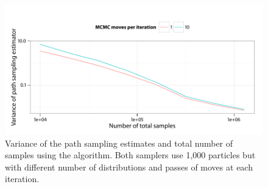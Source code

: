 \begin{figure}[t]
  \UseAltLinespread
  \includegraphics[width=\linewidth]{fig_src/MCMC_Iter_Var}
  \caption[Variance of path sampling estimator and total number of samples
  using \protect\smc algorithm]
  {Variance of the path sampling estimates and total number of samples
    using the \smc[2] algorithm. Both samplers use 1,000 particles but with
    different number of distributions and passes of \mcmc moves at each
    iteration.}
  \label{fig:fast mcmc iter}
\end{figure}
